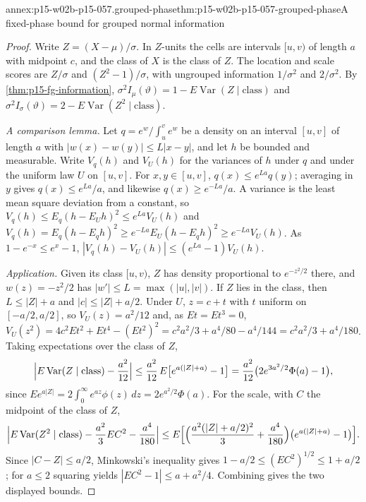\begin{annexitem}{annex:p15-w02b-p15-057.grouped-phase}{thm:p15-w02b-p15-057-grouped-phase}{A fixed-phase bound for grouped normal information}
\begin{proof}
Write \(Z=(X-\mu)/\sigma\). In \(Z\)-units the cells are intervals
\([u,v)\) of length \(a\) with midpoint \(c\), and the class of \(X\) is
the class of \(Z\). The location and scale scores are \(Z/\sigma\) and
\((Z^2-1)/\sigma\), with ungrouped information \(1/\sigma^2\) and
\(2/\sigma^2\). By \cref{thm:p15-fg-information},
\(\sigma^2I_\mu(\vartheta)=1-E\operatorname{Var}(Z\mid\text{class})\) and
\(\sigma^2I_\sigma(\vartheta)=2-E\operatorname{Var}(Z^2\mid\text{class})\).

\emph{A comparison lemma.} Let \(q=e^w/\int_u^ve^w\) be a density on an
interval \([u,v]\) of length \(a\) with
\(|w(x)-w(y)|\leq L|x-y|\), and let \(h\) be bounded and measurable. Write
\(V_q(h)\) and \(V_U(h)\) for the variances of \(h\) under \(q\) and under
the uniform law \(U\) on \([u,v]\). For \(x,y\in[u,v]\),
\(q(x)\leq e^{La}q(y)\); averaging in \(y\) gives \(q(x)\leq e^{La}/a\),
and likewise \(q(x)\geq e^{-La}/a\). A variance is the least mean square
deviation from a constant, so
\(V_q(h)\leq E_q(h-E_Uh)^2\leq e^{La}V_U(h)\) and
\(V_q(h)=E_q(h-E_qh)^2\geq e^{-La}E_U(h-E_qh)^2\geq e^{-La}V_U(h)\).
As \(1-e^{-x}\leq e^x-1\), \(|V_q(h)-V_U(h)|\leq(e^{La}-1)V_U(h)\).

\emph{Application.} Given its class \([u,v)\), \(Z\) has density
proportional to \(e^{-z^2/2}\) there, and \(w(z)=-z^2/2\) has
\(|w'|\leq L=\max(|u|,|v|)\). If \(Z\) lies in the class, then
\(L\leq|Z|+a\) and \(|c|\leq|Z|+a/2\). Under \(U\), \(z=c+t\) with \(t\)
uniform on \([-a/2,a/2]\), so \(V_U(z)=a^2/12\) and, as \(Et=Et^3=0\),
\(V_U(z^2)=4c^2Et^2+Et^4-(Et^2)^2=c^2a^2/3+a^4/80-a^4/144
=c^2a^2/3+a^4/180\). Taking expectations over the class of \(Z\),
\[
 \Bigl|E\operatorname{Var}(Z\mid\text{class})-\frac{a^2}{12}\Bigr|
 \leq\frac{a^2}{12}\,E\bigl[e^{a(|Z|+a)}-1\bigr]
 =\frac{a^2}{12}\bigl(2e^{3a^2/2}\Phi(a)-1\bigr),
\]
since \(Ee^{a|Z|}=2\int_0^\infty e^{az}\phi(z)\,dz=2e^{a^2/2}\Phi(a)\).
For the scale, with \(C\) the midpoint of the class of \(Z\),
\[
 \Bigl|E\operatorname{Var}(Z^2\mid\text{class})
 -\frac{a^2}3EC^2-\frac{a^4}{180}\Bigr|
 \leq E\Bigl[\Bigl(\frac{a^2(|Z|+a/2)^2}{3}+\frac{a^4}{180}\Bigr)
 \bigl(e^{a(|Z|+a)}-1\bigr)\Bigr].
\]
Since \(|C-Z|\leq a/2\), Minkowski's inequality gives
\(1-a/2\leq(EC^2)^{1/2}\leq1+a/2\); for \(a\leq2\) squaring yields
\(|EC^2-1|\leq a+a^2/4\). Combining gives the two displayed bounds.


\end{proof}
\end{annexitem}
